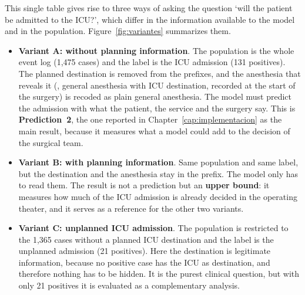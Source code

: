 This single table gives rise to three ways of asking the question `will the patient be admitted to the ICU?', which differ in the information available to the model and in the population. Figure~\ref{fig:variantes} summarizes them.

\begin{itemize}[leftmargin=*]
  \item \textbf{Variant A: without planning information}. The population is the whole event log (1,475 cases) and the label is the ICU admission (131 positives). The planned destination is removed from the prefixes, and the anesthesia that reveals it (, general anesthesia with ICU destination, recorded at the start of the surgery) is recoded as plain general anesthesia. The model must predict the admission with what the patient, the service and the surgery say. This is \textbf{Prediction~2}, the one reported in Chapter~\ref{cap:implementacion} as the main result, because it measures what a model could add to the decision of the surgical team.
  \item \textbf{Variant B: with planning information}. Same population and same label, but the destination and the anesthesia stay in the prefix. The model only has to read them. The result is not a prediction but an \textbf{upper bound}: it measures how much of the ICU admission is already decided in the operating theater, and it serves as a reference for the other two variants.
  \item \textbf{Variant C: unplanned ICU admission}. The population is restricted to the 1,365 cases without a planned ICU destination and the label is the unplanned admission (21 positives). Here the destination is legitimate information, because no positive case has the ICU as destination, and therefore nothing has to be hidden. It is the purest clinical question, but with only 21 positives it is evaluated as a complementary analysis.
\end{itemize}

